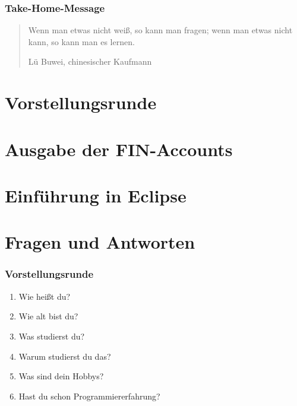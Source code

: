 \documentclass[12pt]{beamer}
\begin{document}
\begin{frame}
	\frametitle{Take-Home-Message}
	\begin{quote}
		Wenn man etwas nicht weiß, so kann man fragen; wenn man etwas nicht
		kann, so kann man es lernen.
		\newline
		\begin{flushright}
		\scriptsize Lü Buwei, chinesischer Kaufmann
		\end{flushright}
	\end{quote}

\end{frame}

\section{Vorstellungsrunde}
\section{Ausgabe der FIN-Accounts}
\section{Einführung in Eclipse}
\section{Fragen und Antworten}

\begin{frame}
	\frametitle{Vorstellungsrunde}
	\begin{enumerate}
		\item Wie heißt du?
		\item Wie alt bist du?
		\item Was studierst du?
		\item Warum studierst du das?
		\item Was sind dein Hobbys?
		\item Hast du schon Programmiererfahrung?
	\end{enumerate}
\end{frame}
\end{document}
